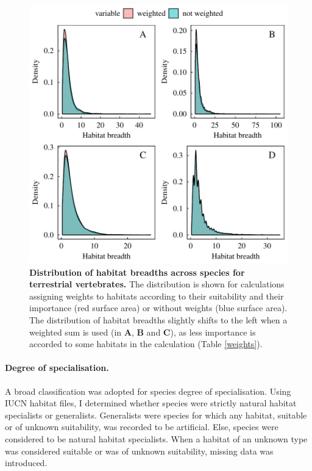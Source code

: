 \documentclass[11pt]{article}
\begin{document}
\begin{figure}[h!]
\centering
\includegraphics[scale=0.8]{figures/Weighted_HB/distributions}
\caption[Distribution of habitat breadths across species for terrestrial vertebrates]{\textbf{Distribution of habitat breadths across species for terrestrial vertebrates.} The distribution is shown for calculations assigning weights to habitats according to their suitability and their importance (red surface area) or without weights (blue surface area). The distribution of habitat breadths slightly shifts to the left when a weighted sum is used (in \textbf{A}, \textbf{B} and \textbf{C}), as less importance is accorded to some habitats in the calculation (Table \ref{weights}).}
\label{distHB}
\end{figure}

\paragraph{Degree of specialisation.}
A broad classification was adopted for species degree of specialisation. Using IUCN habitat files, I determined whether species were strictly natural habitat specialists or generalists. Generalists were species for which any habitat, suitable or of unknown suitability, was recorded to be artificial. Else, species were considered to be natural habitat specialists. When a habitat of an unknown type was considered suitable or was of unknown suitability, missing data was introduced. 
\end{document}
